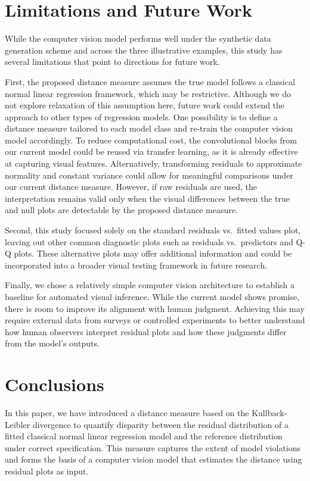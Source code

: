 \documentclass[]{interact}
\theoremstyle{plain}%
\theoremstyle{definition}
\theoremstyle{remark}
\begin{document}
\section{Limitations and Future Work}\label{limitations-and-future-work}

While the computer vision model performs well under the synthetic data
generation scheme and across the three illustrative examples, this study
has several limitations that point to directions for future work.

First, the proposed distance measure assumes the true model follows a
classical normal linear regression framework, which may be restrictive.
Although we do not explore relaxation of this assumption here, future
work could extend the approach to other types of regression models. One
possibility is to define a distance measure tailored to each model class
and re-train the computer vision model accordingly. To reduce
computational cost, the convolutional blocks from our current model
could be reused via transfer learning, as it is already effective at
capturing visual features. Alternatively, transforming residuals to
approximate normality and constant variance could allow for meaningful
comparisons under our current distance measure. However, if raw
residuals are used, the interpretation remains valid only when the
visual differences between the true and null plots are detectable by the
proposed distance measure.

Second, this study focused solely on the standard residuals vs.~fitted
values plot, leaving out other common diagnostic plots such as residuals
vs.~predictors and Q-Q plots. These alternative plots may offer
additional information and could be incorporated into a broader visual
testing framework in future research.

Finally, we chose a relatively simple computer vision architecture to
establish a baseline for automated visual inference. While the current
model shows promise, there is room to improve its alignment with human
judgment. Achieving this may require external data from surveys or
controlled experiments to better understand how human observers
interpret residual plots and how these judgments differ from the model's
outputs.

\section{Conclusions}\label{conclusions}

In this paper, we have introduced a distance measure based on the
Kullback-Leibler divergence to quantify disparity between the residual
distribution of a fitted classical normal linear regression model and
the reference distribution under correct specification. This measure
captures the extent of model violations and forms the basis of a
computer vision model that estimates the distance using residual plots
as input.
\end{document}
